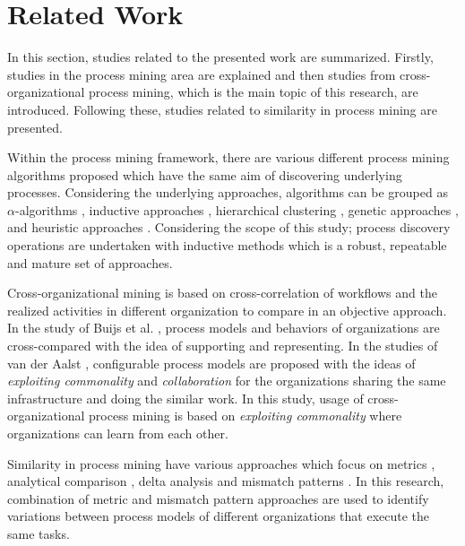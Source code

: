\section{Related Work}
\label{sec:relatedwork}

In this section, studies related to the presented work are summarized. Firstly, studies in the process mining area are explained and then studies from cross-organizational process mining, which is the main topic of this research, are introduced. Following these, studies related to similarity in process mining are presented.

Within the process mining framework, there are various different process mining algorithms proposed which have the same aim of discovering underlying processes. Considering the underlying approaches, algorithms can be grouped as $\alpha$-algorithms \cite{van2004workflow,de2004process}, inductive approaches \cite{herbst1998integrating,herbst2000dealing}, hierarchical clustering \cite{greco2005mining}, genetic approaches \cite{van2005genetic,esgin2010hybrid}, and heuristic approaches \cite{esgin2009hybrid}. Considering the scope of this study; process discovery operations are undertaken with inductive methods which is a robust, repeatable and mature set of approaches.

Cross-organizational mining is based on cross-correlation of workflows and the realized activities in different organization to compare in an objective approach. In the study of Buijs et al. \cite{buijs2012towards}, process models and behaviors of organizations are cross-compared with the idea of supporting and representing. In the studies of van der Aalst \cite{van2011business,van2011intra}, configurable process models are proposed with the ideas of \textit{exploiting commonality} and \textit{collaboration} for the organizations sharing the same infrastructure and doing the similar work. In this study, usage of cross-organizational process mining is based on \textit{exploiting commonality} where organizations can learn from each other.

Similarity in process mining have various approaches which focus on metrics \cite{dijkman2011similarity}, analytical comparison \cite{buijs2014comparing}, delta analysis \cite{esgin2011delta,esgin2013sequence} and mismatch patterns \cite{dijkman2007mismatch}. In this research, combination of metric and mismatch pattern approaches are used to identify variations between process models of different organizations that execute the same tasks.